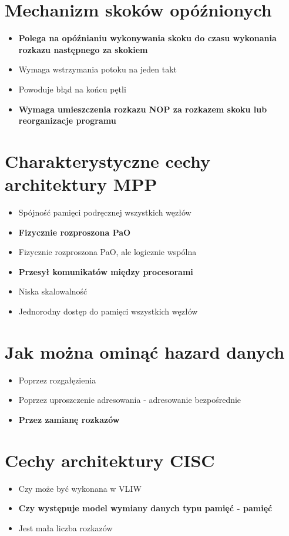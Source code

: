 \documentclass[a4paper,twoside]{article}
\begin{document}
\section{Mechanizm skoków opóźnionych}
	\begin{itemize}
    \item \textbf{Polega na opóźnianiu wykonywania skoku do czasu wykonania rozkazu następnego za skokiem}
    \item Wymaga wstrzymania potoku na jeden takt
    \item Powoduje błąd na końcu pętli
    \item \textbf{Wymaga umieszczenia rozkazu NOP za rozkazem skoku lub reorganizacje programu}
    \end{itemize}
    
\section{Charakterystyczne cechy architektury MPP}
	\begin{itemize}
    \item Spójność pamięci podręcznej wszystkich węzłów
    \item \textbf{Fizycznie rozproszona PaO}
    \item Fizycznie rozproszona PaO, ale logicznie wspólna
    \item \textbf{Przesył komunikatów między procesorami}
    \item Niska skalowalność
    \item Jednorodny dostęp do pamięci wszystkich węzłów
    \end{itemize}

\section{Jak można ominąć hazard danych}
	\begin{itemize}
    \item Poprzez rozgałęzienia
    \item Poprzez uproszczenie adresowania - adresowanie bezpośrednie
    \item \textbf{Przez zamianę rozkazów}
    \end{itemize}

\section{Cechy architektury CISC}
	\begin{itemize}
    \item Czy może być wykonana w VLIW
    \item \textbf{Czy występuje model wymiany danych typu pamięć - pamięć}
    \item Jest mała liczba rozkazów
    \end{itemize}
\end{document}
